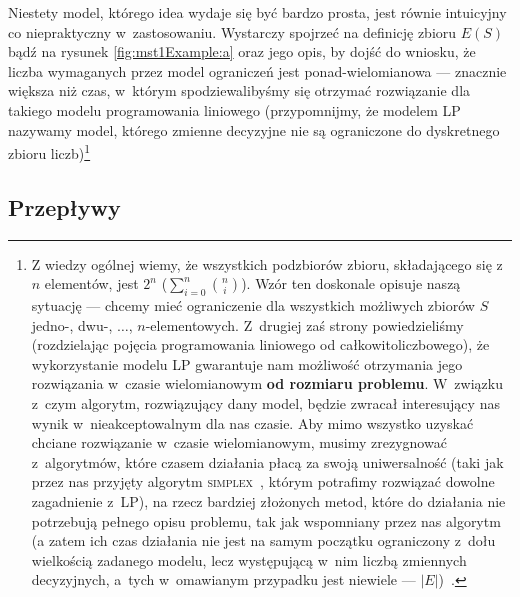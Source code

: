 Niestety model, którego idea wydaje się być bardzo prosta, jest równie intuicyjny co niepraktyczny w~zastosowaniu.
Wystarczy spojrzeć na definicję zbioru $E \left( S \right)$ bądź na rysunek \ref{fig:mst1Example:a} oraz jego opis, by dojść do wniosku, że liczba wymaganych przez model ograniczeń jest ponad-wielomianowa --- znacznie większa niż czas, w~którym spodziewalibyśmy się otrzymać rozwiązanie dla takiego modelu programowania liniowego (przypomnijmy, że modelem \textsc{LP} nazywamy model, którego zmienne decyzyjne nie są ograniczone do dyskretnego zbioru liczb)\footnote{
	Z wiedzy ogólnej wiemy, że wszystkich podzbiorów zbioru, składającego się z~$n$ elementów, jest $2^{n}$ ($\sum_{i=0}^{n} \binom{n}{i}$).
	Wzór ten doskonale opisuje naszą sytuację --- chcemy mieć ograniczenie dla wszystkich możliwych zbiorów $S$ jedno-, dwu-, $\dots$, $n$-elementowych.
	Z~drugiej zaś strony powiedzieliśmy (rozdzielając pojęcia programowania liniowego od całkowitoliczbowego), że wykorzystanie modelu \textsc{LP} gwarantuje nam możliwość otrzymania jego rozwiązania w~czasie wielomianowym \textbf{od rozmiaru problemu}.
	W~związku z~czym algorytm, rozwiązujący dany model, będzie zwracał interesujący nas wynik w~nieakceptowalnym dla nas czasie.
	Aby mimo wszystko uzyskać chciane rozwiązanie w~czasie wielomianowym, musimy zrezygnować z~algorytmów, które czasem działania płacą za swoją uniwersalność (taki jak przez nas przyjęty algorytm \textsc{simplex}~\cite{Gass2011}, którym potrafimy rozwiązać dowolne zagadnienie z~\textsc{LP}), na rzecz bardziej złożonych metod, które do działania nie potrzebują pełnego opisu problemu, tak jak wspomniany przez nas algorytm (a zatem ich czas działania nie jest na samym początku ograniczony z~dołu wielkością zadanego modelu, lecz występującą w~nim liczbą zmiennych decyzyjnych, a~tych w~omawianym przypadku jest niewiele --- $\left| E \right|$)~\cite{DBLP:conf/icalp/BeiCZ15}.
}



\subsection{Przepływy}



